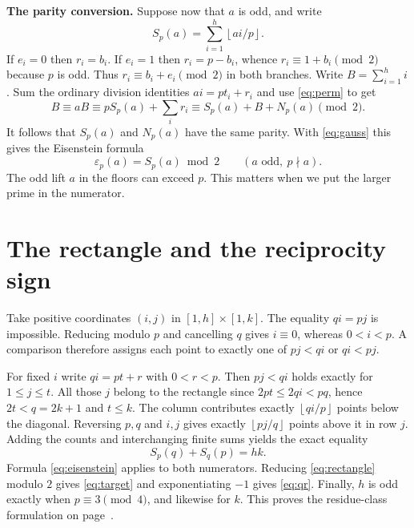 \documentclass[12pt,letterpaper]{article}
\newcommand{\sect}[1]{\section{\texorpdfstring{\color{accent}#1}{#1}}}
\newcommand{\lab}[1]{\textbf{#1.}\enspace}
\newcommand{\floor}[1]{\left\lfloor#1\right\rfloor}
\newcommand{\sgnbit}{\varepsilon}
\newcommand{\iv}[1]{[1,#1]}
\begin{document}
\lab{The parity conversion} Suppose now that $a$ is odd, and write
\[
                 S_p(a)=\sum_{i=1}^h\floor{ai/p}.
\]
If $e_i=0$ then $r_i=b_i$. If $e_i=1$ then $r_i=p-b_i$, whence $r_i\equiv1+b_i\pmod2$ because $p$ is odd. Thus $r_i\equiv b_i+e_i\pmod2$ in both branches. Write $B=\sum_{i=1}^h i$. Sum the ordinary division identities $ai=pt_i+r_i$ and use \eqref{eq:perm} to get
\[
        B\equiv aB\equiv pS_p(a)+\sum_i r_i
          \equiv S_p(a)+B+N_p(a)\pmod2.
\]
It follows that $S_p(a)$ and $N_p(a)$ have the same parity. With \eqref{eq:gauss} this gives the Eisenstein formula
\begin{equation}\label{eq:eisenstein}
             \sgnbit_p(a)=S_p(a)\bmod2\qquad(a\text{ odd},\ p\nmid a).
\end{equation}
The odd lift $a$ in the floors can exceed $p$. This matters when we put the larger prime in the numerator.
\clearpage
\sect{The rectangle and the reciprocity sign}\label{sec:rectangle}
Take positive coordinates $(i,j)$ in $\iv h\times\iv k$. The equality $qi=pj$ is impossible. Reducing modulo $p$ and cancelling $q$ gives $i\equiv0$, whereas $0<i<p$. A comparison therefore assigns each point to exactly one of $pj<qi$ or $qi<pj$.

For fixed $i$ write $qi=pt+r$ with $0<r<p$. Then $pj<qi$ holds exactly for $1\le j\le t$. All those $j$ belong to the rectangle since $2pt\le2qi<pq$, hence $2t<q=2k+1$ and $t\le k$. The column contributes exactly $\floor{qi/p}$ points below the diagonal. Reversing $p,q$ and $i,j$ gives exactly $\floor{pj/q}$ points above it in row $j$. Adding the counts and interchanging finite sums yields the exact equality
\begin{equation}\label{eq:rectangle}
                  S_p(q)+S_q(p)=hk.
\end{equation}
Formula \eqref{eq:eisenstein} applies to both numerators. Reducing \eqref{eq:rectangle} modulo $2$ gives \eqref{eq:target} and exponentiating $-1$ gives \eqref{eq:qr}. Finally, $h$ is odd exactly when $p\equiv3\pmod4$, and likewise for $k$. This proves the residue-class formulation on page~\pageref{sec:statement}.
\end{document}
